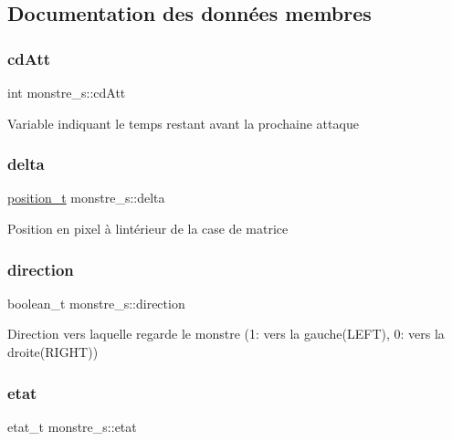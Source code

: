 \subsection{Documentation des données membres}
\mbox{\label{structmonstre__s_ae6f4f8090a2bde0f555b00fc108c9130}} 
\subsubsection{\texorpdfstring{cd\+Att}{cdAtt}}
{\footnotesize\ttfamily int monstre\+\_\+s\+::cd\+Att}

Variable indiquant le temps restant avant la prochaine attaque \mbox{\label{structmonstre__s_a9a4bad53b10cc5379c594dd689750b0c}} 
\subsubsection{\texorpdfstring{delta}{delta}}
{\footnotesize\ttfamily \hyperlink{structposition__s}{position\+\_\+t} monstre\+\_\+s\+::delta}

Position en pixel à l\textquotesingle{}intérieur de la case de matrice \mbox{\label{structmonstre__s_aa1a2d6868b660addc5855614f1849540}} 
\subsubsection{\texorpdfstring{direction}{direction}}
{\footnotesize\ttfamily boolean\+\_\+t monstre\+\_\+s\+::direction}

Direction vers laquelle regarde le monstre (1\+: vers la gauche(\+L\+E\+F\+T), 0\+: vers la droite(\+R\+I\+G\+H\+T)) \mbox{\label{structmonstre__s_a38d270db8b7dd326f1e014eb3b72b740}} 
\subsubsection{\texorpdfstring{etat}{etat}}
{\footnotesize\ttfamily etat\+\_\+t monstre\+\_\+s\+::etat}

